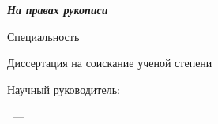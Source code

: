 \thispagestyle{empty}
\begin{center}
	\thesisOrganizationRU
\end{center}
%
\vspace{0pt plus4fill} %
	\begin{flushright}
		\textbf{\textit{На правах рукописи}}
	\end{flushright}
%
\vspace{0pt plus6fill} %
\begin{center}
	{\large \thesisAuthorRU}
\end{center}
%
\vspace{0pt plus1fill} %
\begin{center}
	\textbf {\large %
		\thesisTitleRU}
	
	\vspace{0pt plus2fill} %
	{%
		Специальность \thesisSpecialtyNumberRU\		
		\thesisSpecialtyTitleRU
	}
	
	\vspace{0pt plus2fill} %
	Диссертация на соискание ученой степени
	
	\thesisDegreeRU
\end{center}
%
\vspace{0pt plus4fill} %
\begin{flushright}
	Научный руководитель:
	
	\supervisorRegaliaRU
	
	\supervisorFioRU

\end{flushright}
%
\vspace{0pt plus4fill} %
{\centering\thesisCityRU\ --- \thesisYearRU\par}
